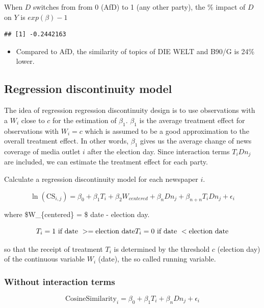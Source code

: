 \documentclass[
]{article}
\providecommand{\tightlist}{%
  \setlength{\itemsep}{0pt}\setlength{\parskip}{0pt}}
\begin{document}
When \(D\) switches from from 0 (AfD) to 1 (any other party), the \%
impact of \(D\) on \(Y\) is \(exp(\beta)-1\)

\begin{verbatim}
## [1] -0.2442163
\end{verbatim}

\begin{itemize}
\tightlist
\item
  Compared to AfD, the similarity of topics of DIE WELT and B90/G is
  24\% lower.
\end{itemize}

\hypertarget{regression-discontinuity-model}{%
\subsection{Regression discontinuity
model}\label{regression-discontinuity-model}}

The idea of regression regression discontinuity design is to use
observations with a \(W_i\) close to \(c\) for the estimation of
\(\beta_1\). \(\beta_1\) is the average treatment effect for
observations with \(W_i = c\) which is assumed to be a good
approximation to the overall treatment effect. In other words,
\(\beta_1\) gives us the average change of news coverage of media outlet
\(i\) after the election day. Since interaction terms \(T_iDn_{j}\) are
included, we can estimate the treatment effect for each party.

Calculate a regression discontinuity model for each newspaper \(i\).

\[
\ln(\text{CS}_{i,j})=\beta_0+\beta_1T_i+\beta_2W_{centered}+\beta_nDn_{j}+\beta_{n+n}T_iDn_{j}+\epsilon_i
\]

where \$W\_\{centered\} = \$ date - election day.

\[
T_i = 1 \text{ if date } >= \text{election date} \\
T_i = 0 \text{ if date } < \text{election date}
\]

so that the receipt of treatment \(T_i\) is determined by the threshold
\(c\) (election day) of the continuous variable \(W_i\) (date), the so
called running variable.

\hypertarget{without-interaction-terms}{%
\subsubsection{Without interaction
terms}\label{without-interaction-terms}}

\[
\text{CosineSimilarity}_{i}=\beta_0+\beta_1T_i+\beta_nDn_{j}+\epsilon_i
\]
\end{document}
